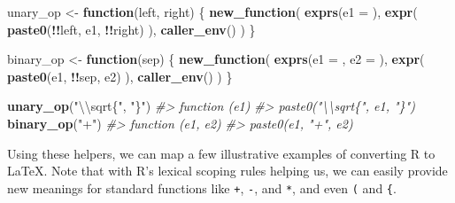 \documentclass[]{book}
\newenvironment{Shaded}{\begin{snugshade}}{\end{snugshade}}
\newcommand{\CharTok}[1]{\textcolor[rgb]{0.5,0.5,0.5}{#1}}
\newcommand{\CommentTok}[1]{\textcolor[rgb]{0.37,0.37,0.37}{\textit{#1}}}
\newcommand{\ControlFlowTok}[1]{\textcolor[rgb]{0.27,0.27,0.27}{\textbf{#1}}}
\newcommand{\DataTypeTok}[1]{\textcolor[rgb]{0.27,0.27,0.27}{#1}}
\newcommand{\KeywordTok}[1]{\textcolor[rgb]{0.27,0.27,0.27}{\textbf{#1}}}
\newcommand{\NormalTok}[1]{#1}
\newcommand{\OperatorTok}[1]{\textcolor[rgb]{0.43,0.43,0.43}{\textbf{#1}}}
\newcommand{\StringTok}[1]{\textcolor[rgb]{0.5,0.5,0.5}{#1}}
\begin{document}
\begin{Shaded}
\begin{Highlighting}[]
\NormalTok{unary_op <-}\StringTok{ }\ControlFlowTok{function}\NormalTok{(left, right) \{}
  \KeywordTok{new_function}\NormalTok{(}
    \KeywordTok{exprs}\NormalTok{(}\DataTypeTok{e1 =}\NormalTok{ ),}
    \KeywordTok{expr}\NormalTok{(}
      \KeywordTok{paste0}\NormalTok{(}\OperatorTok{!!}\NormalTok{left, e1, }\OperatorTok{!!}\NormalTok{right)}
\NormalTok{    ),}
    \KeywordTok{caller_env}\NormalTok{()}
\NormalTok{  )}
\NormalTok{\}}

\NormalTok{binary_op <-}\StringTok{ }\ControlFlowTok{function}\NormalTok{(sep) \{}
  \KeywordTok{new_function}\NormalTok{(}
    \KeywordTok{exprs}\NormalTok{(}\DataTypeTok{e1 =}\NormalTok{ , }\DataTypeTok{e2 =}\NormalTok{ ),}
    \KeywordTok{expr}\NormalTok{(}
      \KeywordTok{paste0}\NormalTok{(e1, }\OperatorTok{!!}\NormalTok{sep, e2)}
\NormalTok{    ),}
    \KeywordTok{caller_env}\NormalTok{()}
\NormalTok{  )}
\NormalTok{\}}

\KeywordTok{unary_op}\NormalTok{(}\StringTok{"}\CharTok{\textbackslash{}\textbackslash{}}\StringTok{sqrt\{"}\NormalTok{, }\StringTok{"\}"}\NormalTok{)}
\CommentTok{#> function (e1) }
\CommentTok{#> paste0("\textbackslash{}\textbackslash{}sqrt\{", e1, "\}")}
\KeywordTok{binary_op}\NormalTok{(}\StringTok{"+"}\NormalTok{)}
\CommentTok{#> function (e1, e2) }
\CommentTok{#> paste0(e1, "+", e2)}
\end{Highlighting}
\end{Shaded}

Using these helpers, we can map a few illustrative examples of converting R to LaTeX. Note that with R's lexical scoping rules helping us, we can easily provide new meanings for standard functions like \texttt{+}, \texttt{-}, and \texttt{*}, and even \texttt{(} and \texttt{\{}.
\end{document}
